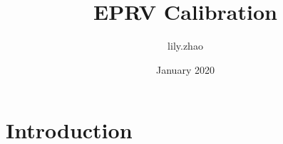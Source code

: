\documentclass{article}
\title{EPRV Calibration}
\author{lily.zhao }
\date{January 2020}
\begin{document}
\maketitle

\section{Introduction}
\end{document}
